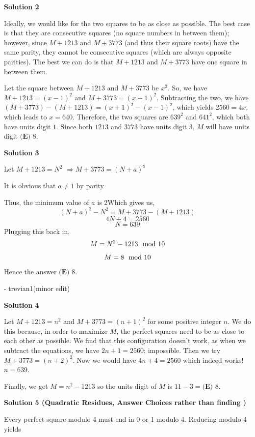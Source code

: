 \begin{enumerate}
\textbf{Solution 2}

Ideally, we would like for the two squares to be as close as possible. The best case is that they are consecutive squares (no square numbers in between them); however, since $M+1213$ and $M+3773$ (and thus their square roots) have the same parity, they cannot be consecutive squares (which are always opposite parities). The best we can do is that $M+1213$ and $M+3773$ have one square in between them. 

 Let the square between $M+1213$ and $M+3773$ be $x^2$. So, we have $M+1213 = (x-1)^2$ and $M+3773 = (x+1)^2$. Subtracting the two, we have $(M+3773)-(M+1213) = (x+1)^2 - (x-1)^2$, which yields $2560 = 4x$, which leads to $x = 640$. Therefore, the two squares are $639^2$ and $641^2$, which both have units digit $1$. Since both $1213$ and $3773$ have units digit $3$, $M$ will have units digit $\boxed{\textbf{(E) }8}$.

 



\textbf{Solution 3}

Let $M+1213=N^2$ $\Rightarrow M+3773=(N+a)^2$

 It is obvious that $a\neq1$ by parity

 Thus, the minimum value of $a$ is 2Which gives us,
 \[(N+a)^2-N^2=M+3773-(M+1213)\]
 \[4N+4=2560\]
 \[N=639\]Plugging this back in,
 \[M=N^2-1213 \space \mod \space 10\]
 \[M=8 \space \mod \space 10\]Hence the answer $\boxed{\textbf{(E) }8}$.

 - trevian1(minor edit)

 



\textbf{Solution 4}

Let $M+1213=n^2$ and $M+3773=(n+1)^2$ for some positive integer $n$. We do this because, in order to maximize $M$, the perfect squares need to be as close to each other as possible. We find that this configuration doesn't work, as when we subtract the equations, we have $2n+1=2560$; impossible. Then we try $M+3773=(n+2)^2$. Now we would have $4n+4=2560$ which indeed works! $n=639$. 

 Finally, we get $M=n^2-1213$ so the units digit of $M$ is $11-3=\boxed{\textbf{(E) }8}.$




\textbf{Solution 5 (Quadratic Residues, Answer Choices rather than finding )}

Every perfect square modulo 4 must end in 0 or 1 modulo 4. Reducing modulo 4 yields 


\end{enumerate}
